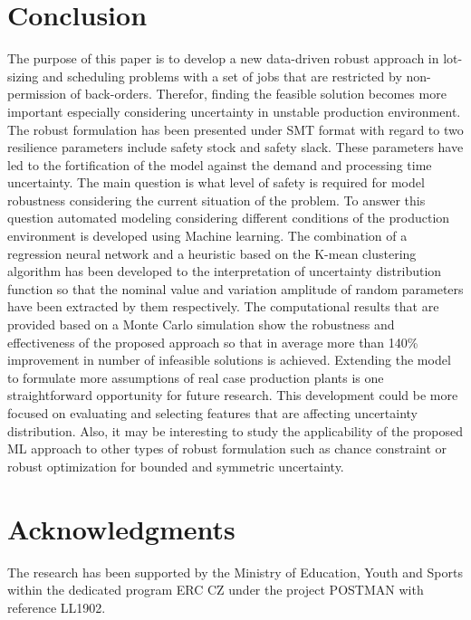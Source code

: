 \documentclass[letterpaper]{article} %
\begin{document}
\section{Conclusion}
The purpose of this paper is to develop a new data-driven robust approach in lot-sizing and scheduling problems with a set of jobs that are restricted by non-permission of back-orders. Therefor, finding the feasible solution becomes more important especially considering uncertainty in unstable production environment. The robust formulation has been presented under SMT  format with regard to two resilience parameters include safety stock and safety slack. These parameters have led to the fortification of the model against the demand and processing time uncertainty. The main question is what level of safety is required for model robustness considering the current situation of the problem. To answer this question automated modeling considering different conditions of the production environment is developed using Machine learning. The combination of a regression neural network and a heuristic based on the K-mean clustering algorithm has been developed to the interpretation of uncertainty distribution function so that the nominal value and variation amplitude of random parameters have been extracted by them respectively. The computational results that are provided based on a Monte Carlo simulation show the robustness and effectiveness of the proposed approach so that in average more than 140\% improvement in number of infeasible solutions is achieved. Extending the model to formulate more assumptions of real case production plants is one straightforward opportunity for future research. This development could be more focused on evaluating and selecting features that are affecting uncertainty distribution. Also, it may be interesting to study the applicability of the proposed ML approach to other types of robust formulation such as chance constraint or robust optimization for bounded and symmetric uncertainty.
\section{Acknowledgments}
The research has been supported by the Ministry of Education, Youth and Sports within the dedicated program ERC CZ under the project POSTMAN with reference LL1902.
\end{document}
